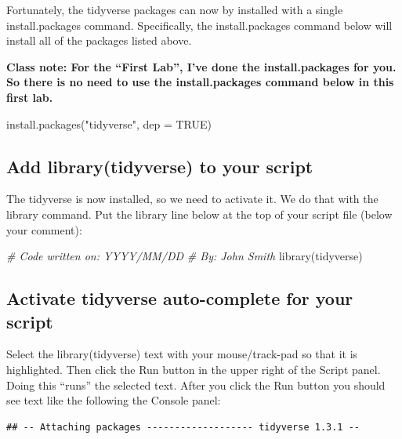 \documentclass[
]{krantz}
\makeatletter
\newenvironment{Shaded}{\begin{snugshade}}{\end{snugshade}}
\newcommand{\AttributeTok}[1]{\textcolor[rgb]{0.61,0.61,0.61}{#1}}
\newcommand{\CommentTok}[1]{\textcolor[rgb]{0.37,0.37,0.37}{\textit{#1}}}
\newcommand{\ConstantTok}[1]{\textcolor[rgb]{0,0,0}{#1}}
\newcommand{\FunctionTok}[1]{\textcolor[rgb]{0,0,0}{#1}}
\newcommand{\NormalTok}[1]{#1}
\newcommand{\StringTok}[1]{\textcolor[rgb]{0.5,0.5,0.5}{#1}}
\newenvironment{kframe}{%
\medskip{}
\setlength{\fboxsep}{.8em}
 \def\at@end@of@kframe{}%
 \ifinner\ifhmode%
  \def\at@end@of@kframe{\end{minipage}}%
  \begin{minipage}{\columnwidth}%
 \fi\fi%
 \def\FrameCommand##1{\hskip\@totalleftmargin \hskip-\fboxsep
 \colorbox{shadecolor}{##1}\hskip-\fboxsep
     \hskip-\linewidth \hskip-\@totalleftmargin \hskip\columnwidth}%
 \MakeFramed {\advance\hsize-\width
   \@totalleftmargin\z@ \linewidth\hsize
   \@setminipage}}%
 {\par\unskip\endMakeFramed%
 \at@end@of@kframe}
\renewenvironment{Shaded}{\begin{kframe}}{\end{kframe}}
\makeatother
\begin{document}
Fortunately, the tidyverse packages can now by installed with a single install.packages command. Specifically, the install.packages command below will install all of the packages listed above.

\textbf{Class note: For the ``First Lab'', I've done the install.packages for you. So there is no need to use the install.packages command below in this first lab.}

\begin{Shaded}
\begin{Highlighting}[]
\FunctionTok{install.packages}\NormalTok{(}\StringTok{"tidyverse"}\NormalTok{, }\AttributeTok{dep =} \ConstantTok{TRUE}\NormalTok{)}
\end{Highlighting}
\end{Shaded}

\hypertarget{add-librarytidyverse-to-your-script}{%
\subsection{Add library(tidyverse) to your script}\label{add-librarytidyverse-to-your-script}}

The tidyverse is now installed, so we need to activate it. We do that with the library command. Put the library line below at the top of your script file (below your comment):

\begin{Shaded}
\begin{Highlighting}[]
\CommentTok{\# Code written on: YYYY/MM/DD }
\CommentTok{\# By: John Smith}
\FunctionTok{library}\NormalTok{(tidyverse)}
\end{Highlighting}
\end{Shaded}

\hypertarget{activate-tidyverse-auto-complete-for-your-script}{%
\subsection{Activate tidyverse auto-complete for your script}\label{activate-tidyverse-auto-complete-for-your-script}}

Select the library(tidyverse) text with your mouse/track-pad so that it is highlighted. Then click the Run button in the upper right of the Script panel. Doing this ``runs'' the selected text. After you click the Run button you should see text like the following the Console panel:

\begin{verbatim}
## -- Attaching packages ------------------- tidyverse 1.3.1 --
\end{verbatim}
\end{document}
